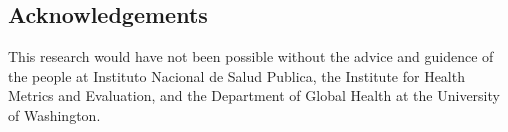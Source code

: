 \documentclass[a0,portrait]{a0poster}
\begin{document}
\begin{multicols}{2}

\section*{Acknowledgements}

This research would have not been possible without the advice and guidence of the people at Instituto Nacional de Salud Publica, the Institute for Health Metrics and Evaluation, and the Department of Global Health at the University of Washington.


\end{multicols}
\end{document}
